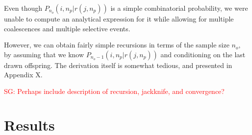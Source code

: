 \documentclass[review]{elsarticle}
\newcommand{\sgcomment}[1]{\textcolor{red}{SG: #1}}
\begin{document}
Even though $P_{n_o}(i,n_p | r(j,n_p))$ is a simple combinatorial probability, we were unable to compute 
an analytical expression for it while allowing for multiple coalescences and multiple selective events.  
 
 However, we can obtain fairly simple recursions in terms of the sample size $n_o,$ 
 by assuming that we know   $P_{n_o-1}(i,n_p | r(j,n_p))$ and conditioning on the last drawn
 offspring. The derivation itself is somewhat tedious, and presented in Appendix X. 

 
  \sgcomment{Perhaps include description of recursion, jackknife, and convergence?}
 \section{Results}
\label{sec:results}
 
 
\end{document}
